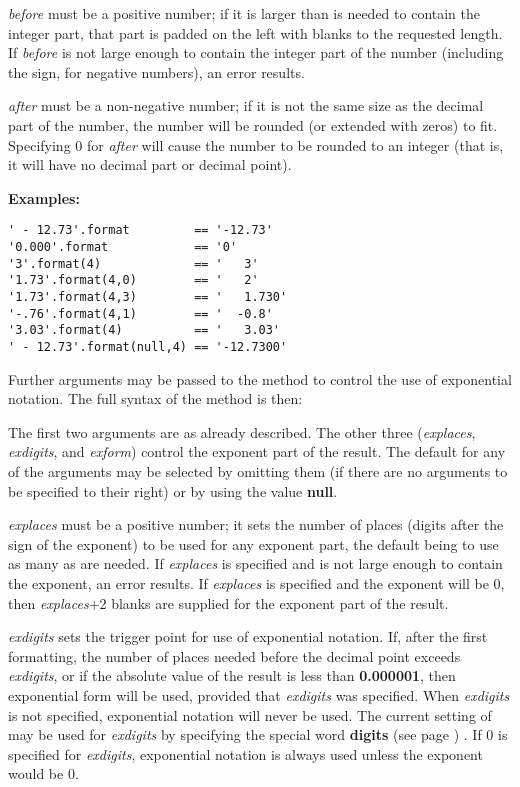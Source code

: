 \begin{description}
\emph{before} must be a positive number; if it is larger than is
needed to contain the integer part, that part is padded on the left with
blanks to the requested length.
If \emph{before} is not large enough to contain the integer part
of the number (including the sign, for negative numbers), an error
results.
 
\emph{after} must be a non-negative number; if it is not the same
size as the decimal part of the number, the number will be rounded (or
extended with zeros) to fit.  Specifying 0 for \emph{after} will
cause the number to be rounded to an integer (that is, it will have no
decimal part or decimal point).
 
\textbf{Examples:}
\begin{lstlisting}
' - 12.73'.format         == '-12.73'
'0.000'.format            == '0'
'3'.format(4)             == '   3'
'1.73'.format(4,0)        == '   2'
'1.73'.format(4,3)        == '   1.730'
'-.76'.format(4,1)        == '  -0.8'
'3.03'.format(4)          == '   3.03'
' - 12.73'.format(null,4) == '-12.7300'
\end{lstlisting}
 
Further arguments may be passed to the  method to control
the use of exponential notation.
The full syntax of the method is then:
 
 The first two arguments are as already described.  The other three
(\emph{explaces}, \emph{exdigits}, and \emph{exform})
control the exponent part of the result.  The default for any of the
arguments may be selected by omitting them (if there are no arguments to
be specified to their right) or by using the value \textbf{null}.
 
\emph{explaces} must be a positive number; it sets the number of
places (digits after the sign of the exponent) to be used for any
exponent part, the default being to use as many as are needed.
If \emph{explaces} is specified and is not large enough to contain
the exponent, an error results.
If \emph{explaces} is specified and the exponent will be 0,
then \emph{explaces}+2 blanks are supplied for the exponent
part of the result.
 
\emph{exdigits} sets the trigger point for use of exponential
notation.
If, after the first formatting, the number of places needed before the
decimal point exceeds \emph{exdigits}, or if the absolute value of
the result is less than \textbf{0.000001}, then exponential form will
be used, provided that \emph{exdigits} was specified.
When \emph{exdigits} is not specified, exponential notation
will never be used.
The current setting of  may be used for
\emph{exdigits} by specifying the special word
 \textbf{digits} (see page \pageref{refswdigit}) .
If 0 is specified for \emph{exdigits}, exponential
notation is always used unless the exponent would be 0.
 

\end{description}

